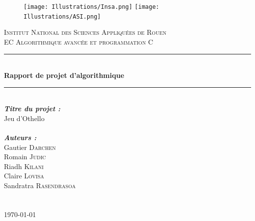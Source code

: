 \documentclass[11pt]{report}
\begin{document}
\renewcommand{\tt}[1]{\og \texttt{#1} \fg}


\begin{titlepage}
\thispagestyle{empty}
\begin{figure}
	\texttt{[image: Illustrations/Insa.png]}\hfill
	\texttt{[image: Illustrations/ASI.png]}\
\end{figure}

\newcommand{\HRule}{\rule{\linewidth}{0.5mm}} 
\center 
{}\textsc{\huge Institut National des Sciences Appliqu\'{e}es de Rouen}\\[1.5cm] 
\textsc{\Large EC Algorithmique avancée et programmation C}\\[2cm] 

\HRule \\[0.4cm]
{ \huge \bfseries Rapport de projet d'algorithmique}\\[0.2cm] 
\HRule \\[2.5cm]
 
\LARGE \emph{\textbf{Titre du projet : }}\\
\LARGE{ \og Jeu d'Othello \fg}\\
~\\[2cm] 


\large \emph{\textbf{Auteurs :}}\\
Gautier \textsc{Darchen}\\ 
Romain \textsc{Judic}\\
Riadh \textsc{Kilani}\\
Claire \textsc{Lovisa}\\
Sandratra \textsc{Rasendrasoa}\\

~\\ ~\\[1cm]

\vfill{\today}\\[3cm]

\end{titlepage}

\thispagestyle{empty}
\clearpage\mbox{}\clearpage

\thispagestyle{plain}
\end{document}
